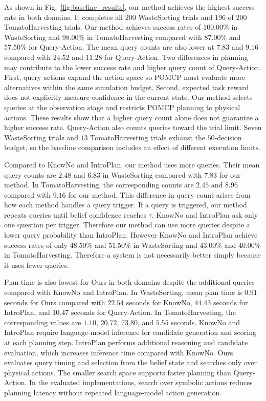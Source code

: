 As shown in Fig.~\ref{fig:baseline_results}, our method achieves the highest success rate in both domains. It completes all $200$ WasteSorting trials and $196$ of $200$ TomatoHarvesting trials. Our method achieves success rates of $100.00\%$ in WasteSorting and $98.00\%$ in TomatoHarvesting compared with $87.00\%$ and $57.50\%$ for Query-Action. The mean query counts are also lower at $7.83$ and $9.16$ compared with $24.52$ and $11.28$ for Query-Action. Two differences in planning may contribute to the lower success rate and higher query count of Query-Action. First, query actions expand the action space so POMCP must evaluate more alternatives within the same simulation budget. Second, expected task reward does not explicitly measure confidence in the current state. Our method selects queries at the observation stage and restricts POMCP planning to physical actions. These results show that a higher query count alone does not guarantee a higher success rate. Query-Action also counts queries toward the trial limit. Seven WasteSorting trials and $13$ TomatoHarvesting trials exhaust the $50$-decision budget, so the baseline comparison includes an effect of different execution limits.

Compared to KnowNo and IntroPlan, our method uses more queries. Their mean query counts are $2.48$ and $6.83$ in WasteSorting compared with $7.83$ for our method. In TomatoHarvesting, the corresponding counts are $2.45$ and $8.96$ compared with $9.16$ for our method. This difference in query count arises from how each method handles a query trigger. If a query is triggered, our method repeats queries until belief confidence reaches $\tau$. KnowNo and IntroPlan ask only one question per trigger. Therefore our method can use more queries despite a lower query probability than IntroPlan. However KnowNo and IntroPlan achieve success rates of only $48.50\%$ and $51.50\%$ in WasteSorting and $43.00\%$ and $40.00\%$ in TomatoHarvesting. Therefore a system is not necessarily better simply because it uses fewer queries.

Plan time is also lowest for Ours in both domains despite the additional queries compared with KnowNo and IntroPlan. In WasteSorting, mean plan time is $0.91$ seconds for Ours compared with $22.54$ seconds for KnowNo, $44.43$ seconds for IntroPlan, and $10.47$ seconds for Query-Action. In TomatoHarvesting, the corresponding values are $1.10$, $20.72$, $73.80$, and $5.55$ seconds. KnowNo and IntroPlan require language-model inference for candidate generation and scoring at each planning step. IntroPlan performs additional reasoning and candidate evaluation, which increases inference time compared with KnowNo. Ours evaluates query timing and selection from the belief state and searches only over physical actions. The smaller search space supports faster planning than Query-Action. In the evaluated implementations, search over symbolic actions reduces planning latency without repeated language-model action generation. %


